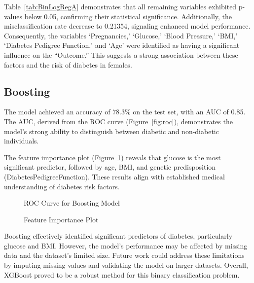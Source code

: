 \documentclass[12pt]{article}
\begin{document}
Table~\ref{tab:BinLogRegA} demonstrates that all remaining variables exhibited p-values below 0.05, confirming their statistical significance. Additionally, the misclassification rate decrease to 0.21354, signaling enhanced model performance. Consequently, the variables ‘Pregnancies,’ ‘Glucose,’ ‘Blood Pressure,’ ‘BMI,’ ‘Diabetes Pedigree Function,’ and ‘Age’ were identified as having a significant influence on the “Outcome.” This suggests a strong association between these factors and the risk of diabetes in females.

\subsection{Boosting}

The model achieved an accuracy of 78.3\% on the test set, with an AUC of 0.85. The AUC, derived from the ROC curve (Figure~\ref{fig:roc}), demonstrates the model's strong ability to distinguish between diabetic and non-diabetic individuals.

The feature importance plot (Figure~\ref{fig:importance}) reveals that glucose is the most significant predictor, followed by age, BMI, and genetic predisposition (DiabetesPedigreeFunction). These results align with established medical understanding of diabetes risk factors.

\begin{figure}[h!]
	\centering
	\begin{minipage}{0.47\textwidth}
		\caption{ROC Curve for Boosting Model}
		\label{fig:roc}
	\end{minipage}
	\hfill %
	\begin{minipage}{0.47\textwidth}
		\centering
		\caption{Feature Importance Plot}
		\label{fig:importance}
	\end{minipage}
\end{figure}


Boosting effectively identified significant predictors of diabetes, particularly glucose and BMI. However, the model's performance may be affected by missing data and the dataset's limited size. Future work could address these limitations by imputing missing values and validating the model on larger datasets. Overall, XGBoost proved to be a robust method for this binary classification problem.
\end{document}
